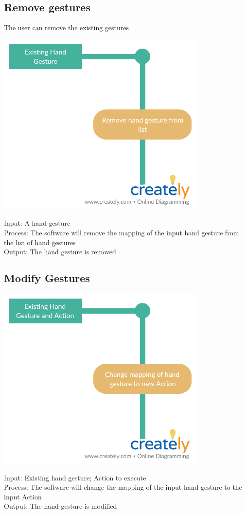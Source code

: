\documentclass[11pt]{report}
\begin{document}
\subsection{Remove gestures}
The user can remove the existing gestures
\begin{center}
    \includegraphics[scale=0.5]{remove.png}
\end{center}
Input: A hand gesture
\\Process: The software will remove the mapping of the input hand gesture from the list of hand gestures
\\Output: The hand gesture is removed
 
\subsection{Modify Gestures}
\begin{center}
    \includegraphics[scale=0.5]{modify.png}
\end{center}
Input: Existing hand gesture; Action to execute
\\Process: The software will change the mapping of the input hand gesture to the input Action
\\Output: The hand gesture is modified
\end{document}
